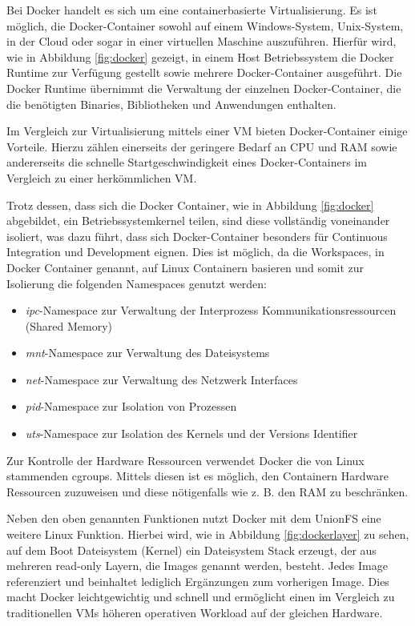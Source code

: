 Bei Docker handelt es sich um eine containerbasierte Virtualisierung.
Es ist möglich, die Docker-Container sowohl auf einem Windows-System, Unix-System, in der Cloud oder sogar in einer virtuellen Maschine auszuführen.
Hierfür wird, wie in Abbildung \ref{fig:docker} gezeigt, in einem Host Betriebssystem die Docker Runtime zur Verfügung gestellt sowie mehrere Docker-Container ausgeführt.
Die Docker Runtime übernimmt die Verwaltung der einzelnen Docker-Container, die die benötigten Binaries, Bibliotheken und Anwendungen enthalten.

Im Vergleich zur Virtualisierung mittels einer \ac{VM} bieten Docker-Container einige Vorteile.
Hierzu zählen einerseits der geringere Bedarf an CPU und RAM sowie andererseits die schnelle Startgeschwindigkeit eines Docker-Containers im Vergleich zu einer herkömmlichen \ac{VM}.

Trotz dessen, dass sich die Docker Container, wie in Abbildung \ref{fig:docker} abgebildet, ein Betriebssystemkernel teilen, sind diese vollständig voneinander isoliert, was dazu führt, dass sich Docker-Container besonders für Continuous Integration und Development eignen.
Dies ist möglich, da die Workspaces, in Docker \glqq{}Container\grqq{} genannt, auf Linux Containern basieren und somit zur Isolierung die folgenden Namespaces genutzt werden:

\begin{itemize}
	\item \textit{ipc}-Namespace zur Verwaltung der Interprozess Kommunikationsressourcen (Shared Memory)
	\item \textit{mnt}-Namespace zur Verwaltung des Dateisystems
	\item \textit{net}-Namespace zur Verwaltung des Netzwerk Interfaces
	\item \textit{pid}-Namespace zur Isolation von Prozessen
	\item \textit{uts}-Namespace zur Isolation des Kernels und der Versions Identifier
\end{itemize}

Zur Kontrolle der Hardware Ressourcen verwendet Docker die von Linux stammenden \ac{cgroups}.
Mittels diesen ist es möglich, den Containern Hardware Ressourcen zuzuweisen und diese nötigenfalls wie z. B. den RAM zu beschränken.

Neben den oben genannten Funktionen nutzt Docker mit dem \ac{UnionFS} eine weitere Linux Funktion.
Hierbei wird, wie in Abbildung \ref{fig:dockerlayer} zu sehen, auf dem Boot Dateisystem (Kernel) ein Dateisystem Stack erzeugt, der aus mehreren read-only Layern, die Images genannt werden, besteht.
Jedes Image referenziert und beinhaltet lediglich Ergänzungen zum vorherigen Image.
Dies macht Docker leichtgewichtig und schnell und ermöglicht einen im Vergleich zu traditionellen \acp{VM} höheren operativen Workload auf der gleichen Hardware.

